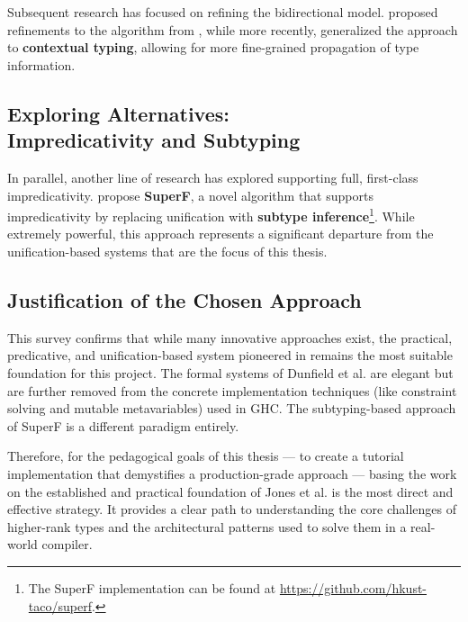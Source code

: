 Subsequent research has focused on refining the bidirectional model. \citeauthor{xie-higher-rank} \cite{xie-higher-rank} proposed refinements to the algorithm from \cite{dunfield-complete-2013}, while more recently, \citeauthor{xue-contextual-2024} \cite{xue-contextual-2024} generalized the approach to \textbf{contextual typing}, allowing for more fine-grained propagation of type information.

\subsection[Exploring Alternatives: Impredicativity and Subtyping]{Exploring Alternatives: \\ Impredicativity and Subtyping}


\enlargethispage{\baselineskip}
In parallel, another line of research has explored supporting full, first-class impredicativity. \citeauthor{parreaux-when-2024} \cite{parreaux-when-2024} propose \textbf{SuperF}, a novel algorithm that supports impredicativity by replacing unification with \textbf{subtype inference}\footnote{The SuperF implementation can be found at \url{https://github.com/hkust-taco/superf}.}. While extremely powerful, this approach represents a significant departure from the unification-based systems that are the focus of this thesis.

\subsection{Justification of the Chosen Approach}

This survey confirms that while many innovative approaches exist, the practical, predicative, and unification-based system pioneered in \cite{jones-practical-2007} remains the most suitable foundation for this project. The formal systems of Dunfield et al. are elegant but are further removed from the concrete implementation techniques (like constraint solving and mutable metavariables) used in GHC. The subtyping-based approach of SuperF is a different paradigm entirely.

Therefore, for the pedagogical goals of this thesis --- to create a tutorial implementation that demystifies a production-grade approach --- basing the work on the established and practical foundation of Jones et al. is the most direct and effective strategy. It provides a clear path to understanding the core challenges of higher-rank types and the architectural patterns used to solve them in a real-world compiler.